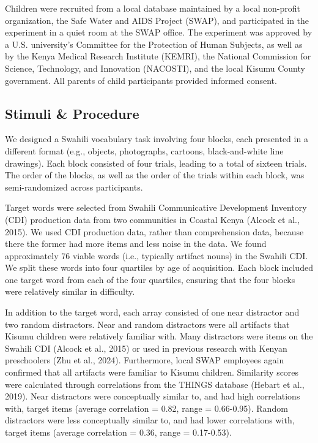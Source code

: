 \documentclass[10pt, letterpaper]{article}
\begin{document}
Children were recruited from a local database maintained by a local
non-profit organization, the Safe Water and AIDS Project (SWAP), and
participated in the experiment in a quiet room at the SWAP office. The
experiment was approved by a U.S. university's Committee for the
Protection of Human Subjects, as well as by the Kenya Medical Research
Institute (KEMRI), the National Commission for Science, Technology, and
Innovation (NACOSTI), and the local Kisumu County government. All
parents of child participants provided informed consent.

\subsection{Stimuli \& Procedure}\label{stimuli-procedure}

We designed a Swahili vocabulary task involving four blocks, each
presented in a different format (e.g., objects, photographs, cartoons,
black-and-white line drawings). Each block consisted of four trials,
leading to a total of sixteen trials. The order of the blocks, as well
as the order of the trials within each block, was semi-randomized across
participants.

Target words were selected from Swahili Communicative Development
Inventory (CDI) production data from two communities in Coastal Kenya
(Alcock et al., 2015). We used CDI production data, rather than
comprehension data, because there the former had more items and less
noise in the data. We found approximately 76 viable words (i.e.,
typically artifact nouns) in the Swahili CDI. We split these words into
four quartiles by age of acquisition. Each block included one target
word from each of the four quartiles, ensuring that the four blocks were
relatively similar in difficulty.

In addition to the target word, each array consisted of one near
distractor and two random distractors. Near and random distractors were
all artifacts that Kisumu children were relatively familiar with. Many
distractors were items on the Swahili CDI (Alcock et al., 2015) or used
in previous research with Kenyan preschoolers (Zhu et al., 2024).
Furthermore, local SWAP employees again confirmed that all artifacts
were familiar to Kisumu children. Similarity scores were calculated
through correlations from the THINGS database (Hebart et al., 2019).
Near distractors were conceptually similar to, and had high correlations
with, target items (average correlation = 0.82, range = 0.66-0.95).
Random distractors were less conceptually similar to, and had lower
correlations with, target items (average correlation = 0.36, range =
0.17-0.53).
\end{document}
